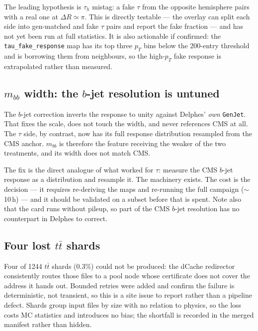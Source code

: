 \documentclass[11pt,a4paper]{article}
\newcommand{\tauh}{\tau_{h}}
\newcommand{\dR}{\Delta R}
\begin{document}
The leading hypothesis is $\tauh$ mistag: a fake $\tau$ from the opposite hemisphere pairs
with a real one at $\dR\simeq\pi$. This is directly testable --- the overlay can split each
side into gen-matched and fake $\tau$ pairs and report the fake fraction --- and has not yet
been run at full statistics. It is also actionable if confirmed: the
\texttt{tau\_fake\_response} map has its top three $p_{T}$ bins below the 200-entry
threshold and is borrowing them from neighbours, so the high-$p_{T}$ fake response is
extrapolated rather than measured.

\subsection{$m_{bb}$ width: the $b$-jet resolution is untuned}
\label{sec:mbb}

The $b$-jet correction inverts the response to unity against Delphes' \emph{own}
\texttt{GenJet}. That fixes the scale, does not touch the width, and never references CMS at
all. The $\tau$ side, by contrast, now has its full response distribution resampled from the
CMS anchor. $m_{bb}$ is therefore the feature receiving the weaker of the two treatments,
and its width does not match CMS.

The fix is the direct analogue of what worked for $\tau$: measure the CMS $b$-jet response
as a distribution and resample it. The machinery exists. The cost is the decision --- it
requires re-deriving the maps and re-running the full campaign ($\sim$10\,h) --- and it
should be validated on a subset before that is spent. Note also that the card runs without
pileup, so part of the CMS $b$-jet resolution has no counterpart in Delphes to correct.

\subsection{Four lost $t\bar t$ shards}
\label{sec:shards}

Four of 1244 $t\bar t$ shards ($0.3\%$) could not be produced: the dCache redirector
consistently routes those files to a pool node whose certificate does not cover the address
it hands out. Bounded retries were added and confirm the failure is deterministic, not
transient, so this is a site issue to report rather than a pipeline defect. Shards group
input files by size with no relation to physics, so the loss costs MC statistics and
introduces no bias; the shortfall is recorded in the merged manifest rather than hidden.
\end{document}
